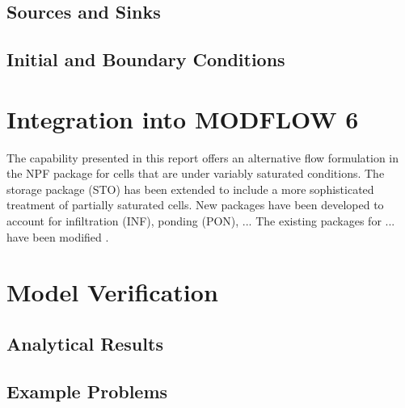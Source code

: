 \documentclass[fleqn]{article}
\begin{document}
\subsection{Sources and Sinks}
\subsection{Initial and Boundary Conditions}

\section{Integration into MODFLOW 6}
The capability presented in this report offers an alternative flow
formulation in the NPF package for cells that are under variably 
saturated conditions. The storage package (STO) has been extended
to include a more sophisticated treatment of partially saturated
cells. New packages have been developed to account for infiltration (INF),
ponding (PON), ... The existing packages for ... have been modified .

\section{Model Verification}
\subsection{Analytical Results}
\subsection{Example Problems}
\end{document}
